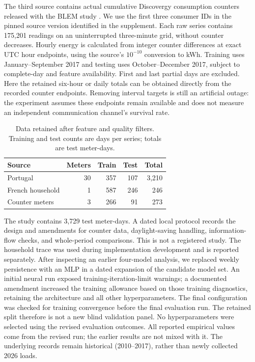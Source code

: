 The third source contains actual cumulative Discovergy consumption counters
released with the BLEM study \citep{blem}. We use the first three consumer
IDs in the pinned source version identified in the supplement. Each raw
series contains 175,201 readings on an uninterrupted three-minute grid,
without counter decreases. Hourly energy is calculated from integer
counter differences at exact UTC hour endpoints, using the source's
$10^{-10}$ conversion to kWh. Training uses January--September 2017 and
testing uses October--December 2017, subject to complete-day and feature
availability. First and last partial days are excluded. Here the retained
six-hour or daily totals can be obtained directly from the recorded
counter endpoints. Removing interval targets is still an artificial outage:
the experiment assumes these endpoints remain available and does not
measure an independent communication channel's survival rate.

\begin{table}[t]
\centering\normalsize
\caption{Data retained after feature and quality filters. Training and
test counts are days per series; totals are test meter-days.}
\label{tab:data}
\begin{tabular}{lrrrr}
\toprule
Source & Meters & Train & Test & Total\\
\midrule
Portugal & 30 & 357 & 107 & 3,210\\
French household & 1 & 587 & 246 & 246\\
Counter meters & 3 & 266 & 91 & 273\\
\bottomrule
\end{tabular}
\end{table}

The study contains 3,729 test meter-days. A dated local protocol records
the design and amendments for counter data, daylight-saving handling,
information-flow checks, and whole-period comparisons. This is not a
registered study. The household trace was used during implementation
development and is reported separately. After inspecting an earlier
four-model analysis, we replaced weekly persistence with an MLP in a
dated expansion of the candidate model set. An initial neural run exposed training-iteration-limit
warnings; a documented amendment increased the training allowance based
on those training diagnostics, retaining the architecture and all other
hyperparameters. The final configuration was checked for training convergence
before the final evaluation run. The retained split therefore is not a new blind
validation panel. No hyperparameters were selected using the revised
evaluation outcomes. All reported empirical values come from the revised
run; the earlier results are not mixed with it. The underlying records
remain historical (2010--2017), rather than newly collected 2026 loads.


